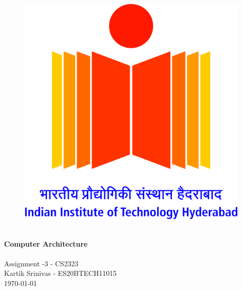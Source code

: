 \begin{titlepage}
    \vbox{ }

    \vbox{ }

    \begin{center}
        \begin{figure}
            \centering
            \includegraphics[scale=0.1]{img/logo.jpg}
            \label{fig:my_label}
        \end{figure}
        

        \noindent\makebox[\linewidth]{\rule{.7\paperwidth}{.6pt}}\\[0.7cm]
        { \huge \bfseries Computer Architecture}\\[0.25cm]
        \noindent\makebox[\linewidth]{\rule{.7\paperwidth}{.6pt}}\\[0.7cm]
        \large{Assignment -3 - CS2323}\\[1.2cm]
        \vfill
        \large
        Kartik Srinivas - ES20BTECH11015\\
            {\large \today}
    \end{center}
\end{titlepage}